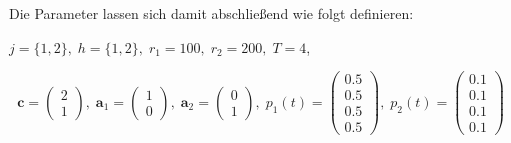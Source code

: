 Die Parameter lassen sich damit abschließend wie folgt definieren:
\begin{center}
$j = \{1, 2\}, \; h = \{1, 2\}, \; r_{1} = 100, \; r_{2} = 200, \; T=4$,
\end{center}
\[
    \textbf{c}=\begin{pmatrix} 2 \\ 1 \end{pmatrix}, \;
    \textbf{a}_1=\begin{pmatrix} 1 \\ 0 \end{pmatrix}, \;
     \textbf{a}_2=\begin{pmatrix} 0 \\ 1 \end{pmatrix}, \;
     p_{1}(t)=\begin{pmatrix} 0.5\\ 0.5\\ 0.5\\ 0.5  \end{pmatrix}, \;
     p_{2}(t)=\begin{pmatrix} 0.1\\ 0.1\\ 0.1\\ 0.1  \end{pmatrix}
  \]

